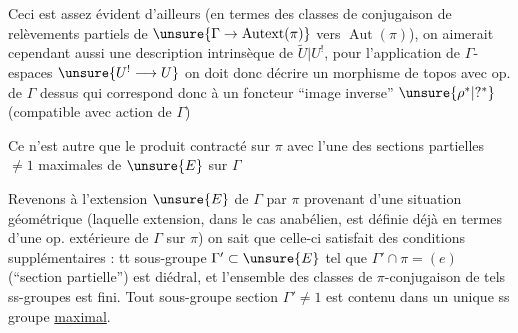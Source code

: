 Ceci est assez évident d'ailleurs
(en termes  des classes de
\inserted{\(\pi\)-}conjugaison de relèvements partiels de
\(\unsure{\Gamma\to\operatorname{Autext}(\pi)}\) vers
\(\operatorname{Aut}(\pi)\)), on aimerait cependant aussi une
description intrinsèque de \(\widetilde U|U^!\),
  pour l'application de
\(\Gamma\)-espaces \(\unsure{U^!\longrightarrow U}\)
on doit donc décrire un morphisme de topos avec op. de \(\Gamma\) dessus
qui correspond donc à un  foncteur
``image inverse'' \(\unsure{\rho^*|?^*}\)
(compatible avec action de \(\Gamma\))

Ce  n'est autre que le produit contracté sur
\(\pi\) avec l'une des sections partielles \(\ne1\) maximales de
\(\unsure{E}\) sur \(\Gamma\)



Revenons à l'extension \(\unsure{E}\) de \(\Gamma\) par \(\pi\)
provenant d'une situation géométrique
(laquelle extension, dans le cas anabélien, est définie déjà en termes
d'une op. extérieure de \(\Gamma\) sur \(\pi\))
on sait que celle-ci satisfait des conditions supplémentaires
 :
tt sous-groupe \(\Gamma'\subset\unsure{E}\) tel que
\(\Gamma'\cap\pi=(e)\) (``section partielle'') est
 diédral,
et l'ensemble des classes de \(\pi\)-conjugaison de tels ss-groupes
est fini.
Tout sous-groupe section \(\Gamma'\ne1\) est contenu dans un unique
ss groupe  \uline{maximal}.

